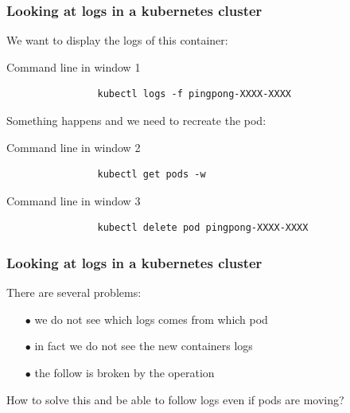 	\begin{frame}[fragile]
		\frametitle{Looking at logs in a kubernetes cluster}
	
		We want to display the logs of this container:
		\begin{block}{Command line in window 1}
			\begin{verbatim}
				kubectl logs -f pingpong-XXXX-XXXX
			\end{verbatim}
		\end{block}
		
		Something happens and we need to recreate the pod:
		\begin{block}{Command line in window 2}
			\begin{verbatim}
				kubectl get pods -w
			\end{verbatim}
		\end{block}
		\begin{block}{Command line in window 3}
			\begin{verbatim}
				kubectl delete pod pingpong-XXXX-XXXX
			\end{verbatim}
		\end{block}
	\end{frame}
	
	
	\begin{frame}[fragile]
		\frametitle{Looking at logs in a kubernetes cluster}
	
		There are several problems:
		\begin{itemize}
			\item[$\bullet$] we do not see which logs comes from which pod
			\item[$\bullet$] in fact we do not see the new containers logs
			\item[$\bullet$] the follow is broken by the operation
		\end{itemize}
		
		How to solve this and be able to follow logs even if pods are moving?
	\end{frame}

